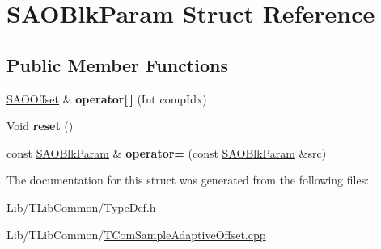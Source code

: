 \hypertarget{struct_s_a_o_blk_param}{}\section{S\+A\+O\+Blk\+Param Struct Reference}
\label{struct_s_a_o_blk_param}
\subsection*{Public Member Functions}
\begin{DoxyCompactItemize}
\item 
\mbox{\label{struct_s_a_o_blk_param_a950b1dca932b7e3470a26b2c10de51a2}} 
\hyperlink{struct_s_a_o_offset}{S\+A\+O\+Offset} \& {\bfseries operator\mbox{[}$\,$\mbox{]}} (Int comp\+Idx)
\end{DoxyCompactItemize}
{\bf }\par
\begin{DoxyCompactItemize}
\item 
\mbox{\label{struct_s_a_o_blk_param_afe21a0b18ac66c0fd345f2b2097cd1c3}} 
Void {\bfseries reset} ()
\item 
\mbox{\label{struct_s_a_o_blk_param_a82435e6a7e11172a278376f0e6e759f7}} 
const \hyperlink{struct_s_a_o_blk_param}{S\+A\+O\+Blk\+Param} \& {\bfseries operator=} (const \hyperlink{struct_s_a_o_blk_param}{S\+A\+O\+Blk\+Param} \&src)
\end{DoxyCompactItemize}



The documentation for this struct was generated from the following files\+:\begin{DoxyCompactItemize}
\item 
Lib/\+T\+Lib\+Common/\hyperlink{_type_def_8h}{Type\+Def.\+h}\item 
Lib/\+T\+Lib\+Common/\hyperlink{_t_com_sample_adaptive_offset_8cpp}{T\+Com\+Sample\+Adaptive\+Offset.\+cpp}\end{DoxyCompactItemize}
